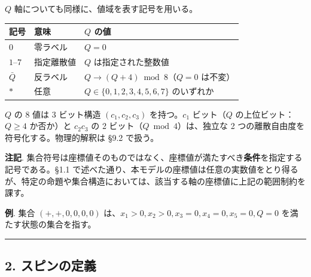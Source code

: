\documentclass[
  a4paper,11pt]{ltjsarticle}
\newcounter{none}
\theoremstyle{definition}
\theoremstyle{remark}
\begin{document}
\(Q\) 軸についても同様に、値域を表す記号を用いる。

{\def\LTcaptype{none} %
\begin{longtable}[]{@{}
  >{\centering\arraybackslash}p{}
  >{\raggedright\arraybackslash}p{}
  >{\raggedright\arraybackslash}p{}@{}}
\toprule\noalign{}
\begin{minipage}[b]{\linewidth}\centering
記号
\end{minipage} & \begin{minipage}[b]{\linewidth}\raggedright
意味
\end{minipage} & \begin{minipage}[b]{\linewidth}\raggedright
\(Q\) の値
\end{minipage} \\
\midrule\noalign{}
\endhead
\bottomrule\noalign{}
\endlastfoot
\(0\) & 零ラベル & \(Q = 0\) \\
\(1\)--\(7\) & 指定離散値 & \(Q\) は指定された整数値 \\
\(\bar{Q}\) & 反ラベル & \(Q \to (Q + 4) \bmod 8\)（\(Q = 0\)
は不変） \\
\(*\) & 任意 & \(Q \in \{0, 1, 2, 3, 4, 5, 6, 7\}\) のいずれか \\
\end{longtable}
}

\(Q\) の 8 値は 3 ビット構造 \((c_1, c_2, c_3)\) を持つ。\(c_1\)
ビット（\(Q\) の上位ビット：\(Q \geq 4\) か否か）と \(c_2 c_3\) の 2
ビット（\(Q \bmod 4\)）は、独立な 2
つの離散自由度を符号化する。物理的解釈は §9.2 で扱う。

\textbf{注記}.
集合符号は座標値そのものではなく、座標値が満たすべき\textbf{条件}を指定する記号である。§1.1
で述べた通り、本モデルの座標値は任意の実数値をとり得るが、特定の命題や集合構造においては、該当する軸の座標値に上記の範囲制約を課す。

\textbf{例}. 集合 \((+, +, 0, 0, 0, 0)\)
は、\(x_1 > 0, x_2 > 0, x_3 = 0, x_4 = 0, x_5 = 0, Q = 0\)
を満たす状態の集合を指す。

\begin{center}\rule{0.5\linewidth}{0.5pt}\end{center}

\subsection{2. スピンの定義}\label{ux30b9ux30d4ux30f3ux306eux5b9aux7fa9}
\end{document}
